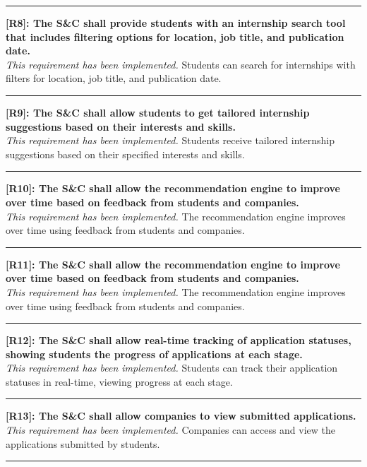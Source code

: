 \noindent\rule{16cm}{0.4pt}

\noindent\textbf{[R8]: The S\&C shall provide students with an internship search tool that includes filtering options for location, job title, and publication date.} \\
\textit{This requirement has been implemented.} Students can search for internships with filters for location, job title, and publication date.

\noindent\rule{16cm}{0.4pt}

\noindent\textbf{[R9]: The S\&C shall allow students to get tailored internship suggestions based on their interests and skills.} \\
\textit{This requirement has been implemented.} Students receive tailored internship suggestions based on their specified interests and skills.

\noindent\rule{16cm}{0.4pt}

\noindent\textbf{[R10]: The S\&C shall allow the recommendation engine to improve over time based on feedback from students and companies.} \\
\textit{This requirement has been implemented.} The recommendation engine improves over time using feedback from students and companies.

\noindent\rule{16cm}{0.4pt}

\noindent\textbf{[R11]: The S\&C shall allow the recommendation engine to improve over time based on feedback from students and companies.} \\
\textit{This requirement has been implemented.} The recommendation engine improves over time using feedback from students and companies.

\noindent\rule{16cm}{0.4pt}

\noindent\textbf{[R12]: The S\&C shall allow real-time tracking of application statuses, showing students the progress of applications at each stage.} \\
\textit{This requirement has been implemented.} Students can track their application statuses in real-time, viewing progress at each stage.

\noindent\rule{16cm}{0.4pt}

\noindent\textbf{[R13]: The S\&C shall allow companies to view submitted applications.} \\
\textit{This requirement has been implemented.} Companies can access and view the applications submitted by students.

\noindent\rule{16cm}{0.4pt}

